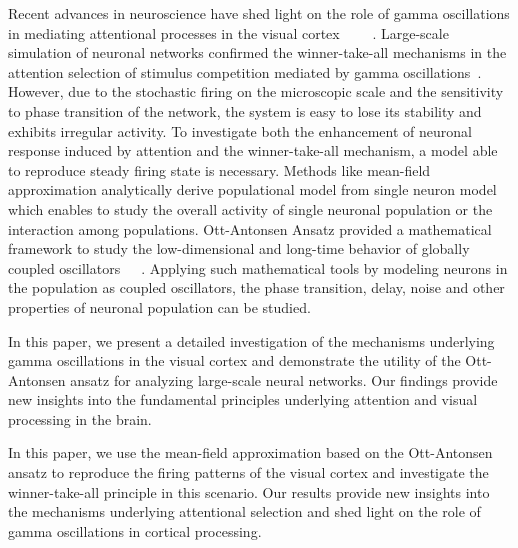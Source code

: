 \documentclass[10pt,letterpaper]{article}
\begin{document}
Recent advances in neuroscience have shed light on the role of gamma oscillations in mediating attentional processes in the visual cortex ~\cite{fries2009}~\cite{tiesinga2009}~\cite{ardid2010}~\cite{magazzini2018}. Large-scale simulation of neuronal networks confirmed the winner-take-all mechanisms in the attention selection of stimulus competition mediated by gamma oscillations~\cite{borgers2008}. However, due to the stochastic firing on the microscopic scale and the sensitivity to phase transition of the network, the system is easy to lose its stability and exhibits irregular activity. To investigate both the enhancement of neuronal response induced by attention and the winner-take-all mechanism, a model able to reproduce steady firing state is necessary. Methods like mean-field approximation analytically derive populational model from single neuron model which enables to study the overall activity of single neuronal population or the interaction among populations. Ott-Antonsen Ansatz provided a mathematical framework to study the low-dimensional and long-time behavior of globally coupled oscillators~\cite{ott2008}~\cite{ott2009}~\cite{montbrio2015}. Applying such mathematical tools by modeling neurons in the population as coupled oscillators, the phase transition, delay, noise and other properties of neuronal population can be studied. 

In this paper, we present a detailed investigation of the mechanisms underlying gamma oscillations in the visual cortex and demonstrate the utility of the Ott-Antonsen ansatz for analyzing large-scale neural networks. Our findings provide new insights into the fundamental principles underlying attention and visual processing in the brain.



In this paper, we use the mean-field approximation based on the Ott-Antonsen ansatz to reproduce the firing patterns of the visual cortex and investigate the winner-take-all principle in this scenario. Our results provide new insights into the mechanisms underlying attentional selection and shed light on the role of gamma oscillations in cortical processing.
\end{document}
